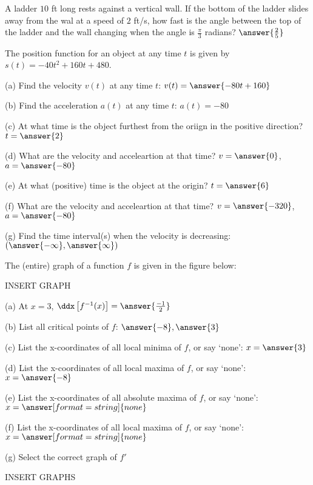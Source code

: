 \documentclass{ximera}
\begin{document}
\begin{exercise}
A ladder $10$ ft long rests against a vertical wall. If the bottom of the ladder slides away from the wal at a speed of $2$ ft/s, how fast is the angle between the top of the ladder and the wall changing when the angle is $\frac{\pi}{3}$ radians?  $\answer{\frac{2}{5}}$
\end{exercise}

\begin{exercise}
The position function for an object at any time $t$ is given by $s(t)=-40t^2+160t+480$.

(a) Find the velocity $v(t)$ at any time $t$: $v(t)=\answer{-80t+160}$

(b) Find the acceleration $a(t)$ at any time $t$: $a(t)=-80$

(c) At what time is the object furthest from the oriign in the positive direction? $t=\answer{2}$

(d) What are the velocity and acceleartion at that time? $v=\answer{0}$, $a=\answer{-80}$

(e) At what (positive) time is the object at the origin? $t=\answer{6}$

(f) What are the velocity and acceleartion at that time? $v=\answer{-320}$, $a=\answer{-80}$

(g) Find the time interval(s) when the velocity is decreasing: $(\answer{-\infty},\answer{\infty})$
\end{exercise}

\begin{exercise}
The (entire) graph of a function $f$ is given in the figure below:

INSERT GRAPH

(a) At $x=3$, $\ddx\left[f^{-1}(x)\right]=\answer{\frac{-1}{2}}$

(b) List all critical points of $f$: $\answer{-8},\answer{3}$

(c) List the x-coordinates of all local minima of $f$, or say `none': $x=\answer{3}$

(d) List the x-coordinates of all local maxima of $f$, or say `none': $x=\answer{-8}$

(e) List the x-coordinates of all absolute maxima of $f$, or say `none': $x=\answer[format=string]{none}$

(f) List the x-coordinates of all local maxima of $f$, or say `none': $x=\answer[format=string]{none}$

(g) Select the correct graph of $f'$

INSERT GRAPHS
\end{exercise}
\end{document}
